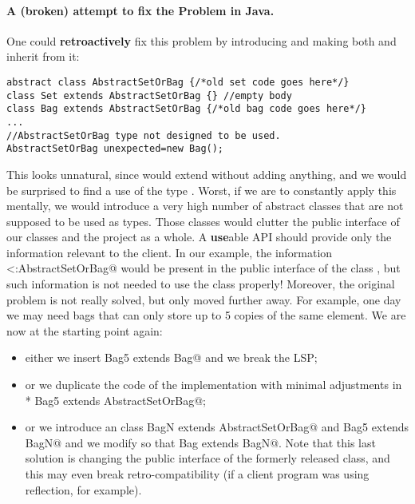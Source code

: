 \paragraph{A (broken) attempt to fix the Problem in Java.}
One could \textbf{retroactively} fix this problem by introducing \Q@AbstractSetOrBag@
and making both \Q@Bag@ and \Q@Set@ inherit from it:
\saveSpace\saveSpace
\begin{lstlisting}
abstract class AbstractSetOrBag {/*old set code goes here*/}
class Set extends AbstractSetOrBag {} //empty body
class Bag extends AbstractSetOrBag {/*old bag code goes here*/}
...
//AbstractSetOrBag type not designed to be used.
AbstractSetOrBag unexpected=new Bag(); 
\end{lstlisting}
\saveSpace\saveSpace
This looks unnatural, since \Q@Set@ would extend \Q@AbstractSetOrBag@ without adding anything,
and we would be surprised to find a use of the type \Q@AbstractSetOrBag@.
Worst, if we are to constantly apply this mentally, we would introduce a very high number
of abstract classes that are not supposed to be used as types. Those classes would clutter the 
public interface of our classes and the project as a whole.
A \textbf{use}able API should provide only the information relevant to the client.
In our example, the information \Q@Set<:AbstractSetOrBag@ would be present in the public interface
of the class \Q@Set@, but such information is not needed to use the class properly!
Moreover, the original problem is not really solved, but only moved 
further away. For example, one day  we may need bags that can only store up to 5 copies of the same element.
We are now at the starting point again:
\begin{itemize}
\item either we insert \Q@class Bag5 extends Bag@ and we break the LSP; 
\item or we duplicate the code of the \Q@Bag@ implementation with minimal
  adjustments in \\* \Q@class Bag5 extends AbstractSetOrBag@;
\item or we introduce an
\Q@abstract class BagN extends AbstractSetOrBag@ and \Q@class Bag5 extends BagN@
and we modify \Q@Bag@ so that  \Q@class Bag extends BagN@.
Note that this last solution is changing the public interface of the formerly released \Q@Bag@ class, and
this may even break retro-compatibility (if a client program was using
reflection, for example).
\end{itemize}

